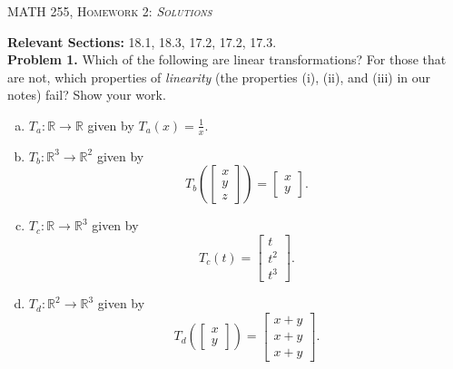 \documentclass[12pt]{report} %
\newcommand{\R}{\mathbb{R}}
\theoremstyle{definition}
\begin{document}
\begin{center}
   \textsc{\large MATH 255, Homework 2: \emph{Solutions}}\\
\end{center}
\vspace{.5cm}

\noindent\textbf{Relevant Sections:} 18.1, 18.3, 17.2, 17.2, 17.3.\\

\noindent\textbf{Problem 1.} Which of the following are linear transformations? For those that are not, which properties of \emph{linearity} (the properties (i), (ii), and (iii) in our notes) fail? Show your work.
\begin{enumerate}[(a)]
    \item $T_a \colon \R \to \R$ given by $T_a(x)=\frac{1}{x}$.
    \item $T_b \colon \R^3 \to \R^2$ given by
    \[
    T_b \left( \begin{bmatrix} x\\ y\\ z \end{bmatrix}\right)
    = \begin{bmatrix} x\\ y \end{bmatrix}.
    \]
    \item $T_c \colon \R \to \R^3$ given by
    \[
    T_c(t)=\begin{bmatrix} t\\ t^2\\ t^3 \end{bmatrix}.
    \]
    \item $T_d \colon \R^2 \to \R^3$ given by
    \[
    T_d\left( \begin{bmatrix} x\\ y \end{bmatrix}\right)
    = \begin{bmatrix} x+y\\ x+y\\ x+y \end{bmatrix}.
    \]
\end{enumerate}
\end{document}
